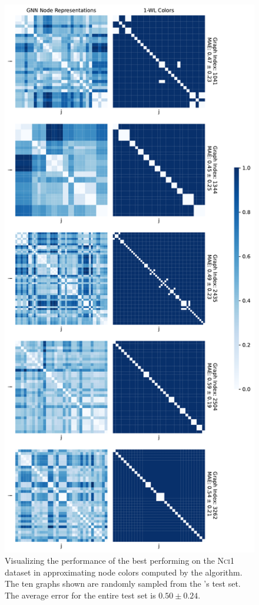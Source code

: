 \begin{figure}[H]
\begin{minipage}[b]{0.45992852703\textwidth}
    \end{minipage}
    \hfill
    \begin{minipage}[b]{0.53007147296\textwidth}
        \includegraphics[width=\textwidth, right]{Figures/heatmaps_NCI1_1.pdf}
    \end{minipage}
    \hfill
    \caption{Visualizing the performance of the best performing \gnn on the \textsc{Nci1} dataset in approximating node colors computed by the \wl algorithm. The ten graphs shown are randomly sampled from the \gnn's test set. The average error for the entire test set is $0.50 \pm 0.24$.}
    \label{fig:gnn_approx_nci_3}
\end{figure}
\clearpage



